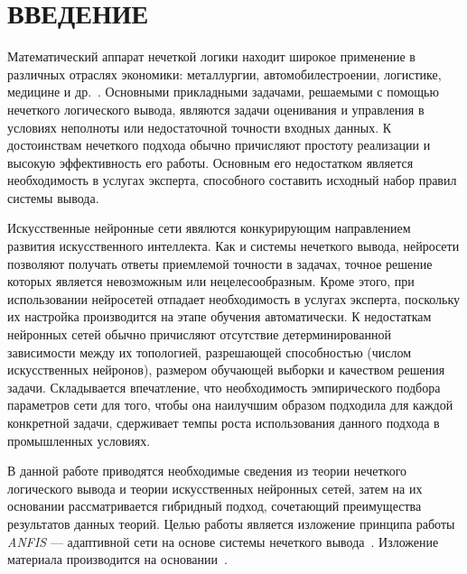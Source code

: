 \section*{ВВЕДЕНИЕ}

Математический аппарат нечеткой логики находит широкое применение
в различных отраслях экономики: металлургии, автомобилестроении,
логистике, медицине и др.~\cite{terano92}.
Основными прикладными задачами, решаемыми с помощью нечеткого логического вывода,
являются задачи оценивания и управления в условиях неполноты или
недостаточной точности входных данных.
К достоинствам нечеткого подхода обычно причисляют простоту реализации
и высокую эффективность его работы.
Основным его недостатком является необходимость в услугах эксперта,
способного составить исходный набор правил системы вывода.

Искусственные нейронные сети явялются конкурирующим направлением развития
искусственного интеллекта.
Как и системы нечеткого вывода, нейросети позволяют получать ответы
приемлемой точности в задачах, точное решение которых является невозможным
или нецелесообразным.
Кроме этого, при использовании нейросетей отпадает необходимость в
услугах эксперта, поскольку их настройка производится на этапе обучения
автоматически.
К недостаткам нейронных сетей обычно причисляют отсутствие
детерминированной зависимости между их топологией,
разрешающей способностью (числом искусственных нейронов),
размером обучающей выборки и качеством решения задачи.
Складывается впечатление, что необходимость эмпирического подбора параметров сети
для того, чтобы она наилучшим образом подходила для каждой конкретной задачи,
сдерживает темпы роста использования данного подхода в промышленных условиях.

В данной работе приводятся необходимые сведения из
теории нечеткого логического вывода и теории искусственных нейронных сетей,
затем на их основании рассматривается гибридный подход,
сочетающий преимущества результатов данных теорий.
Целью работы является изложение принципа работы \emph{ANFIS} ---
адаптивной сети на основе системы нечеткого
вывода~\cite{Jang93anfis:adaptive-network-based}.
Изложение материала производится на основании~\cite{kruglov2001}.
